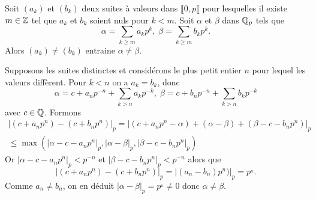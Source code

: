 \begin{propn}\label{prop:UnicitéDevP-adiq}
 Soit $(a_k)$ et $(b_k)$ deux suites  à valeurs dans $\llbracket 0, p \llbracket$ pour lesquelles il existe $m\in \mathbb{Z}$ tel que $a_k$ et $b_k$ soient nuls pour $k<m$. Soit $\alpha$ et $\beta$ dans $\mathbb{Q}_p$ tels que
 \begin{displaymath}
  \alpha = \sum_{k\geq m}a_k p^{k} , \; \beta = \sum_{k\geq m}b_k p^{k}.
 \end{displaymath}
Alors $(a_k) \neq (b_k)$ entraine $\alpha \neq \beta$.
\end{propn}
\begin{demo}
 Supposons les suites distinctes et considérons le plus petit entier $n$ pour lequel les valeurs diffèrent. Pour $k<n$ on a $a_k = b_k$, donc
 \begin{displaymath}
  \alpha = c + a_n p^{-n} + \sum_{k>n}a_kp^{-k} , \;
  \beta = c + b_n p^{-n} + \sum_{k>n}b_kp^{-k}
 \end{displaymath}
 avec $c \in \mathbb{Q}$. Formons
 \begin{multline*}
  |(c+a_np^n) - (c+b_np^n)|_p = |(c+a_np^n - \alpha) + (\alpha - \beta) + ( \beta - c - b_np^n)|_p \\
    \leq \max\left( |\alpha - c -a_np^n|_p, |\alpha - \beta|_p, |\beta - c -b_np^n|_p\right)
 \end{multline*}
Or $|\alpha - c -a_np^n|_p < p^{-n}$ et $|\beta - c -b_np^n|_p < p^{-n}$ alors que
\begin{displaymath}
 |(c+a_np^n) - (c+b_np^n)|_p = |(a_n - b_n)p^n)|_p = p^{_n}.
\end{displaymath}
Comme $a_n \neq b_n$, on en déduit $|\alpha - \beta|_p = p^{_n} \neq 0$ donc $\alpha \neq \beta$.
\end{demo}

